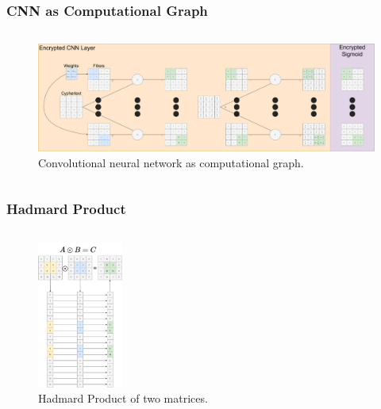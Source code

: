 \documentclass[aspectratio=169]{beamer}
\begin{document}
  \begin{frame}
    \frametitle{CNN as Computational Graph}
    \begin{columns}
      \begin{column}{1\textwidth}
        \begin{figure}[th!]
          \centering
          \includegraphics[width=1\textwidth]{cnn_computational_graph.pdf}
          \caption{Convolutional neural network as computational graph. \autocite{repository}}
          \label{fig:cnn_computational_graph}
        \end{figure}
      \end{column}
    \end{columns}
  \end{frame}

  \begin{frame}
    \frametitle{Hadmard Product}
    \begin{columns}
      \begin{column}{1\textwidth}
        \begin{figure}[th!]
          \centering
          \includegraphics[width=0.25\textwidth]{hadmard_product.pdf}
          \caption{Hadmard Product of two matrices. \autocite{repository}}
          \label{fig:hadmard_product}
        \end{figure}
      \end{column}
    \end{columns}
  \end{frame}
\end{document}
